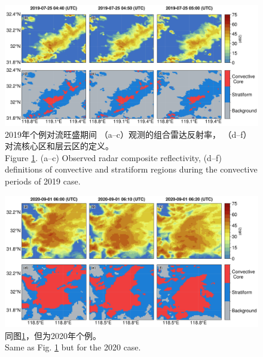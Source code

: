 \clearpage\vspace*{\fill}
\begin{figure}[H]
\centering
\includegraphics[width=\textwidth]{./figures/china_classification_2019.png}
\caption{
2019年个例对流旺盛期间
（a--c）观测的组合雷达反射率，
（d--f）对流核心区和层云区的定义。\\
Figure \ref{fig:china_classification_2019}.
(a--c) Observed radar composite reflectivity,
(d--f) definitions of convective and stratiform regions during the convective periods of 2019 case.
}
\label{fig:china_classification_2019}
\end{figure}

\begin{figure}[H]
\centering
\includegraphics[width=\textwidth]{./figures/china_classification_2020.png}
\caption{
同图\ref{fig:china_classification_2019}，但为2020年个例。\\
Same as Fig. \ref{fig:china_classification_2019} but for the 2020 case.
}
\label{fig:china_classification_2020}
\end{figure}
\vspace*{\fill}\clearpage

